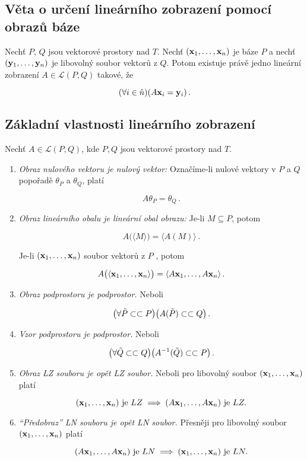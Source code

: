 \subsection*{Věta o určení lineárního zobrazení pomocí obrazů báze}

Nechť $P$, $Q$ jsou vektorové prostory nad $T$. Nechť $(\mathbf{x}_1,\dots,\mathbf{x}_n)$ je
báze $P$ a nechť $(\mathbf{y}_1,\dots,\mathbf{y}_n)$ je libovolný soubor vektorů z $Q$. Potom
existuje právě jedno lineární zobrazení $A\in\mathcal L(P,Q)$ takové, že

\[ (\forall i\in\hat{n})(A\mathbf{x}_{i}=\mathbf{y}_{i})\,. \]

\subsection*{Základní vlastnosti lineárního zobrazení}

Nechť $A\in\mathcal L(P,Q)$, kde $P,Q$ jsou vektorové prostory nad $T$.

\begin{enumerate}
      \item \emph{Obraz nulového vektoru je nulový vektor:}  Označíme-li nulové vektory v $P$ a $Q$ popořadě $\theta_P$ a $\theta_Q$, platí

            \[ A\theta_P=\theta_Q\,. \]

      \item \emph{Obraz lineárního obalu je lineární obal obrazu:} Je-li $M\subseteq P$, potom

            \[ A\big(\langle M\rangle \big)=\big\langle A(M)\big\rangle \,. \]

            Je-li $(\mathbf{x}_1,\dots,\mathbf{x}_n)$ soubor vektorů z $P$ , potom

            \[ A\big(\langle \mathbf{x}_1,\dots,\mathbf{x}_n\rangle \big)=\langle A\mathbf{x}_1,\dots,A\mathbf{x}_n\rangle \,. \]

      \item \emph{Obraz podprostoru je podprostor.} Neboli

            \[ \big(\forall \tilde{P}\subset \subset P\big) \big(A(\tilde{P})\subset \subset Q\big)\,. \]

      \item \emph{Vzor podprostoru je podprostor.} Neboli

            \[ \big(\forall \tilde{Q}\subset \subset Q\big) \big(A^{-1}(\tilde{Q})\subset \subset P\big)\,. \]

      \item \emph{Obraz LZ souboru je opět LZ soubor.} Neboli pro libovolný soubor $(\mathbf{x}_1,\dots,\mathbf{x}_n)$ platí

            \[ (\mathbf{x}_1,\dots,\mathbf{x}_n)\text{ je } LZ \implies (A\mathbf{x}_1,\dots,A\mathbf{x}_n)\text{ je } LZ. \]

      \item \emph{``Předobraz'' LN souboru je opět LN soubor.} Přesněji pro libovolný soubor $(\mathbf{x}_1,\dots,\mathbf{x}_n)$ platí

            \[ (A\mathbf{x}_1,\dots,A\mathbf{x}_n)\text{ je } LN \implies (\mathbf{x}_1,\dots,\mathbf{x}_n)\text{ je } LN. \]

\end{enumerate}


